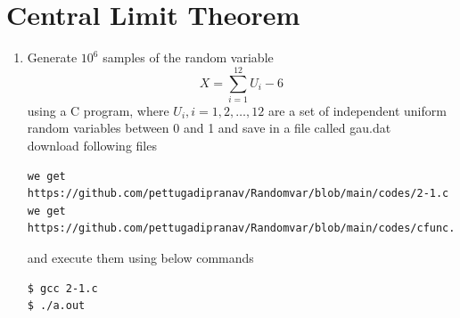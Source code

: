 \documentclass[journal,12pt,twocolumn]{IEEEtran}
\renewcommand\thesection{\arabic{section}}
\begin{document}
\section{Central Limit Theorem}
%
\begin{enumerate}[label=\thesection.\arabic*
,ref=\thesection.\theenumi]

%
\item
Generate $10^6$ samples of the random variable
%
\begin{equation}
X = \sum_{i=1}^{12}U_i -6
\end{equation}
%
using a C program, where $U_i, i = 1,2,\dots, 12$ are  a set of independent uniform random variables between 0 and 1
and save in a file called gau.dat\\
\solution download following files
\begin{lstlisting}
we get https://github.com/pettugadipranav/Randomvar/blob/main/codes/2-1.c
we get https://github.com/pettugadipranav/Randomvar/blob/main/codes/cfunc.h
\end{lstlisting}
and execute them using below commands
\begin{lstlisting}
$ gcc 2-1.c
$ ./a.out
\end{lstlisting}


\end{enumerate}
\end{document}
